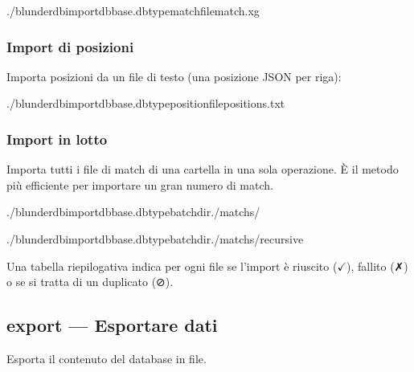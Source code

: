 \documentclass[letterpaper,10pt,italian]{sphinxmanual}
\begin{document}
\begin{sphinxVerbatim}[commandchars=\\\{\}]
./blunderdbimport\PYGZhy{}\PYGZhy{}dbbase.db\PYGZhy{}\PYGZhy{}typematch\PYGZhy{}\PYGZhy{}filematch.xg
\end{sphinxVerbatim}


\subsubsection{Import di posizioni}
\label{\detokenize{cli:import-de-positions}}
\sphinxAtStartPar
Importa posizioni da un file di testo (una posizione JSON per riga):

\begin{sphinxVerbatim}[commandchars=\\\{\}]
./blunderdbimport\PYGZhy{}\PYGZhy{}dbbase.db\PYGZhy{}\PYGZhy{}typeposition\PYGZhy{}\PYGZhy{}filepositions.txt
\end{sphinxVerbatim}


\subsubsection{Import in lotto}
\label{\detokenize{cli:import-par-lot}}
\sphinxAtStartPar
Importa tutti i file di match di una cartella in una sola operazione. È il metodo più efficiente per importare un gran numero di match.

\begin{sphinxVerbatim}[commandchars=\\\{\}]
./blunderdbimport\PYGZhy{}\PYGZhy{}dbbase.db\PYGZhy{}\PYGZhy{}typebatch\PYGZhy{}\PYGZhy{}dir./matchs/

./blunderdbimport\PYGZhy{}\PYGZhy{}dbbase.db\PYGZhy{}\PYGZhy{}typebatch\PYGZhy{}\PYGZhy{}dir./matchs/\PYGZhy{}\PYGZhy{}recursive
\end{sphinxVerbatim}

\sphinxAtStartPar
Una tabella riepilogativa indica per ogni file se l’import è riuscito (\(\checkmark\)), fallito (✗) o se si tratta di un duplicato (⊘).


\subsection{export — Esportare dati}
\label{\detokenize{cli:export-exporter-des-donnees}}
\sphinxAtStartPar
Esporta il contenuto del database in file.
\end{document}
